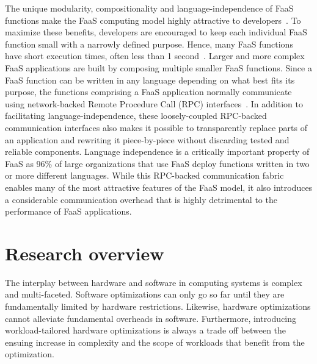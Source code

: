 \documentclass[../main.tex]{subfiles}
\begin{document}
\begin{refsection}
The unique modularity, compositionality and language-independence of
FaaS functions make the FaaS computing model highly attractive to
developers~\cite{williams16_growin_need_micros_bioin}. To maximize
these benefits, developers are encouraged to keep each individual FaaS
function small with a narrowly defined purpose. Hence, many FaaS
functions have short execution times, often less than 1
second~\cite{shahrad19_archit_implic_funct_servic_comput,mahgoub22_wisef,shahrad20_server_wild,lukewarm_serverless,du20_catal}.
Larger and more complex FaaS applications are built by composing
multiple smaller FaaS functions. Since a FaaS function can be written
in any language depending on what best fits its purpose, the functions
comprising a FaaS application normally communicate using
network-backed Remote Procedure Call (RPC)
interfaces~\cite{gan19_open_sourc_bench_suite_micros}. In addition to
facilitating language-independence, these loosely-coupled RPC-backed
communication interfaces also makes it possible to transparently
replace parts of an application and rewriting it piece-by-piece
without discarding tested and reliable components. Language
independence is a critically important property of FaaS as 96\% of
large organizations that use FaaS deploy functions written in two or
more different languages\cite{serverless_state}. While this RPC-backed
communication fabric enables many of the most attractive features of
the FaaS model, it also introduces a considerable communication
overhead that is highly detrimental to the performance of FaaS
applications.  






\section{Research overview}
The interplay between hardware and software in computing systems is
complex and multi-faceted. Software optimizations can only go so far
until they are fundamentally limited by hardware
restrictions. Likewise, hardware optimizations cannot alleviate
fundamental overheads in software. Furthermore, introducing
workload-tailored hardware optimizations is always a trade off between
the ensuing increase in complexity and the scope of workloads that
benefit from the optimization.


\end{refsection}
\end{document}
